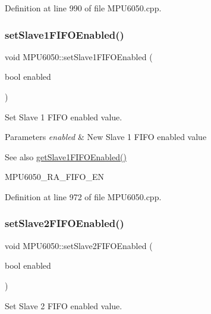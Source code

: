 Definition at line 990 of file M\+P\+U6050.\+cpp.

\mbox{\label{classMPU6050_a5d432fa2fb8b2227f50aa5c7b5befb66}} 
\subsubsection{\texorpdfstring{setSlave1FIFOEnabled()}{setSlave1FIFOEnabled()}}
{\footnotesize\ttfamily void M\+P\+U6050\+::set\+Slave1\+F\+I\+F\+O\+Enabled (\begin{DoxyParamCaption}\item[{bool}]{enabled }\end{DoxyParamCaption})}



Set Slave 1 F\+I\+FO enabled value. 


\begin{DoxyParams}{Parameters}
{\em enabled} & New Slave 1 F\+I\+FO enabled value \\
\hline
\end{DoxyParams}
\begin{DoxySeeAlso}{See also}
\mbox{\hyperlink{classMPU6050_afd6a9b55a589c83c9a0fb0b5b2a88234}{get\+Slave1\+F\+I\+F\+O\+Enabled()}} 

M\+P\+U6050\+\_\+\+R\+A\+\_\+\+F\+I\+F\+O\+\_\+\+EN 
\end{DoxySeeAlso}


Definition at line 972 of file M\+P\+U6050.\+cpp.

\mbox{\label{classMPU6050_a38a10ac4f30b96718ec021dc0db8587b}} 
\subsubsection{\texorpdfstring{setSlave2FIFOEnabled()}{setSlave2FIFOEnabled()}}
{\footnotesize\ttfamily void M\+P\+U6050\+::set\+Slave2\+F\+I\+F\+O\+Enabled (\begin{DoxyParamCaption}\item[{bool}]{enabled }\end{DoxyParamCaption})}



Set Slave 2 F\+I\+FO enabled value. 


